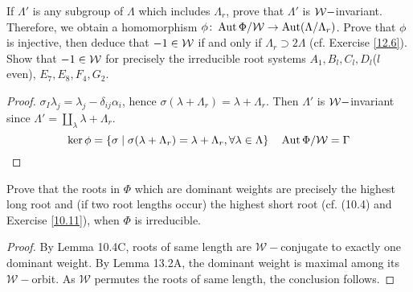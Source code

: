 \begin{ex}
  If $\Lambda'$ is any subgroup of $\Lambda$ which includes $\Lambda_r$, prove that $\Lambda'$ is ${\cal W}-$invariant. Therefore, we obtain a homomorphism $\phi\colon \operatorname{Aut}\Phi/{\cal W} \to \operatorname{Aut}(\Lambda/\Lambda_r)$. Prove that $\phi$ is injective, then deduce that $ -1\in {\cal W}$ if and only if $\Lambda_r \supset 2\Lambda$ (cf. Exercise \ref{12.6}). Show that $ -1\in{\cal W}$ for precisely the irreducible root systems $A_1,B_l,C_l,D_l$($l$ even), $E_7, E_8,  F_4, G_2$.
\end{ex}
\begin{proof}
  $\sigma_I\lambda_j=\lambda_j-\delta_{ij}\alpha_i$, hence $\sigma(\lambda+\Lambda_r)=\lambda+\Lambda_r$. Then $\Lambda'$ is ${\cal W}-$invariant since $\Lambda'=\coprod\limits_{\lambda}\lambda+\Lambda_r$.
  \begin{equation*}
    \ker\phi=\{\sigma\mid \sigma(\lambda+\Lambda_r)=\lambda+\Lambda_r, \forall \lambda\in\Lambda\}\quad \operatorname{Aut}\Phi/{\cal W}=\Gamma
  \end{equation*}
  
\end{proof}

\begin{ex}
  Prove that the roots in $\Phi$ which are dominant weights are precisely the highest long root and (if two root lengths occur) the highest short root (cf. (10.4) and Exercise \ref{10.11}), when $\Phi$ is irreducible.
\end{ex}
\begin{proof}
	By Lemma 10.4C, roots of same length are $\mathcal{W}-$conjugate to exactly one dominant weight. By Lemma 13.2A, the dominant weight is maximal among its $\mathcal{W}-$orbit. As $\mathcal{W}$ permutes the roots of same length, the conclusion follows.
\end{proof}

